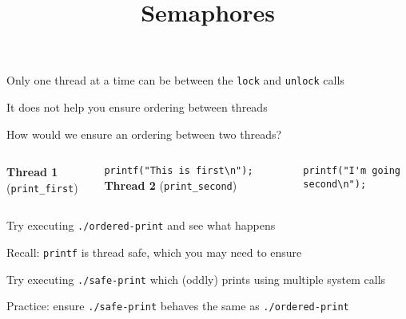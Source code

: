 

\title{Semaphores}



  \begin{frame}
    \titlepage
  \end{frame}

  \begin{slide}

    Only one thread at a time can be between the \texttt{lock} and
    \texttt{unlock} calls
    \medskip

    It does not help you ensure ordering between threads
    \medskip

    How would we ensure an ordering between two threads?

  \end{slide}

  \begin{slide}


    \begin{columns}
        {\bf Thread 1} (\verb+print_first+)

        \verb+printf("This is first\n");+
        {\bf Thread 2} (\verb+print_second+)

        \verb+printf("I'm going second\n");+
    \end{columns}
    \medskip

    Try executing \texttt{./ordered-print} and see what happens
    \bigskip

    Recall: \texttt{printf} is thread safe, which you may need to ensure

    \leftspace{}Try executing \texttt{./safe-print} which (oddly) prints using
                 multiple system calls

    \leftspace{}Practice: ensure \texttt{./safe-print} behaves the same as
                 \texttt{./ordered-print}

  \end{slide}

